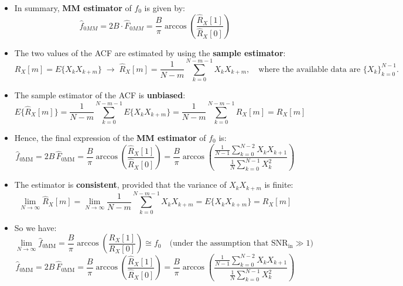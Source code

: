 \begin{itemize}
    \item In summary, \textbf{MM estimator} of \(f_0\) is given by:
    \[
    \hat{f}_{0MM} = 2B\cdot\hat{F}_{0MM} =\frac{B}{\pi}\arccos\left(\frac{\hat{R}_X[1]}{\hat{R}_X[0]}\right)
    \]
    \item The two values of the ACF are estimated by using the \textbf{sample estimator}:
    \[
R_X[m] = E\{X_k X_{k+m}\}
\;\longrightarrow\;
\hat{R}_X[m] = \frac{1}{N-m} \sum_{k=0}^{N-m-1} X_k X_{k+m},
\quad
\text{where the available data are } \{X_k\}_{k=0}^{N-1}.
\]
    \item The sample estimator of the ACF is \textbf{unbiased}:
    \[
E\{\hat{R}_X[m]\}
= \frac{1}{N-m} \sum_{k=0}^{N-m-1} E\{X_k X_{k+m}\}
= \frac{1}{N-m} \sum_{k=0}^{N-m-1} R_X[m]
= R_X[m]
\]
    \item Hence, the final expression of the \textbf{MM estimator} of \(f_0\) is:
    \[
\hat{f}_{0\mathrm{MM}}
= 2B\, \hat{F}_{0\mathrm{MM}}
= \frac{B}{\pi}\arccos\!\left( \frac{\hat{R}_X[1]}{\hat{R}_X[0]} \right)
= \frac{B}{\pi}\arccos\!\left(
    \frac{\displaystyle \frac{1}{N-1}\sum_{k=0}^{N-2} X_k X_{k+1}}
         {\displaystyle \frac{1}{N}\sum_{k=0}^{N-1} X_k^{2}}
  \right)
\]
    \item The estimator is \textbf{consistent}, provided that the variance of \(X_kX_{k+m}\) is finite:
    \[
\lim_{N \to \infty} \hat{R}_X[m]
= \lim_{N \to \infty} \frac{1}{N-m} \sum_{k=0}^{N-m-1} X_k X_{k+m}
= E\{X_k X_{k+m}\}
= R_X[m]
\]
    \item So we have:
    \[
\lim_{N \to \infty} \hat{f}_{0\mathrm{MM}}
= \frac{B}{\pi}\arccos\!\left(\frac{R_X[1]}{R_X[0]}\right)
\cong f_0
\quad \text{(under the assumption that } \mathrm{SNR}_{\mathrm{in}} \gg 1\text{)}
\]
\[
\hat{f}_{0\mathrm{MM}}
= 2B\,\hat{F}_{0\mathrm{MM}}
= \frac{B}{\pi}\arccos\!\left( \frac{\hat{R}_X[1]}{\hat{R}_X[0]} \right)
= \frac{B}{\pi}\arccos\!\left(
    \frac{\displaystyle \frac{1}{N-1}\sum_{k=0}^{N-2} X_k X_{k+1}}
         {\displaystyle \frac{1}{N}\sum_{k=0}^{N-1} X_k^{2}}
  \right)
\]

    
  
\end{itemize}


